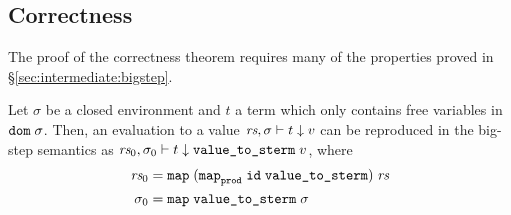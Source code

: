\subsection{Correctness}

The proof of the correctness theorem requires many of the properties proved in §\ref{sec:intermediate:bigstep}.

\begin{theorem}
  \label{thm:intermediate:value}
  Let $\sigma$ be a closed environment and $t$ a term which only contains free variables in $\texttt{\textup{dom}}\;\sigma$.
  Then, an evaluation to a value $\textit{rs}, \sigma \vdash t \downarrow v$ can be reproduced in the big-step semantics as $\textit{rs}_0, \sigma_0 \vdash t \downarrow \texttt{\textup{value\_to\_sterm}}\;v$, where
  \begin{align*}
    \textit{rs}_0 &= \texttt{\textup{map}}\;(\texttt{\textup{map}}_{\texttt{\textup{prod}}}\;\texttt{\textup{id}}\;\texttt{\textup{value\_to\_sterm}})\;\textit{rs} \\
    \sigma_0 &= \texttt{\textup{map}}\;\texttt{\textup{value\_to\_sterm}}\;\sigma
  \end{align*}
\end{theorem}

